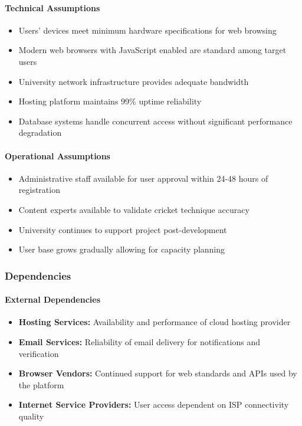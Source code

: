 \documentclass[12pt,a4paper]{article}
\begin{document}
\begin{enumerate}
\paragraph{Technical Assumptions}
\begin{itemize}
    \item Users' devices meet minimum hardware specifications for web browsing
    \item Modern web browsers with JavaScript enabled are standard among target users
    \item University network infrastructure provides adequate bandwidth
    \item Hosting platform maintains 99\% uptime reliability
    \item Database systems handle concurrent access without significant performance degradation
\end{itemize}

\paragraph{Operational Assumptions}
\begin{itemize}
    \item Administrative staff available for user approval within 24-48 hours of registration
    \item Content experts available to validate cricket technique accuracy
    \item University continues to support project post-development
    \item User base grows gradually allowing for capacity planning
\end{itemize}

\subsubsection{Dependencies}
\paragraph{External Dependencies}
\begin{itemize}
    \item \textbf{Hosting Services:} Availability and performance of cloud hosting provider
    \item \textbf{Email Services:} Reliability of email delivery for notifications and verification
    \item \textbf{Browser Vendors:} Continued support for web standards and APIs used by the platform
    \item \textbf{Internet Service Providers:} User access dependent on ISP connectivity quality
\end{itemize}


\end{enumerate}
\end{document}
